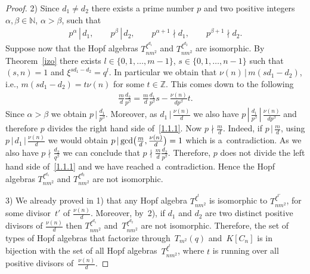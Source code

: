 \documentclass[10pt,a4paper]{amsart}
\numberwithin{equation}{section}
\begin{document}
\begin{proof}
2) Since $d_{1} \neq d_{2}$ there exists a prime number $p$ and two positive integers $\alpha, \beta \in \mathbb{N}$, $\alpha > \beta$, such that
\begin{gather*}
p^{\alpha} \,|\, d_{1}, \qquad p^{\beta} \,|\, d_{2}, \qquad p^{\alpha+1} \nmid d_{1}, \qquad p^{\beta+1} \nmid d_{2}.
\end{gather*}
Suppose now that the Hopf algebras $T_{nm^{2}}^ {\xi^{d_{1}}}$ and $T_{nm^{2}}^ {\xi^{d_{2}}}$ are isomorphic. By Theorem~\ref{izo} there
exists $l \in \{ 0, 1,\dots, m-1 \}$, $s \in \{ 0, 1, \dots, n-1 \}$ such that $(s, n) = 1$ and $\xi^{sd_{1} - d_{2}} = q^{l}$. In particular we obtain that $\nu(n) \,|\, m(sd_{1} - d_{2})$, i.e., $m(sd_{1} - d_{2}) = t \nu(n)$ for some $t \in \mathbb{Z}$. This comes down to the following
\begin{gather}\label{1.1.1}
 \frac{m}{d} \frac{d_{2}}{p^{\beta}} = \frac{m}{d} \frac{d_{1}}{p^{\beta}} s - \frac{\nu(n)}{dp^{\beta}} t.
\end{gather}
Since $\alpha > \beta$ we obtain $p \,|\, \frac{d_{1}}{p^{\beta}}$. Moreover, as $ d_{1} \,|\, \frac{\nu(n)}{d}$ we also have $p \,|\,\frac{d_{1}}{p^{\beta}} \,|\, \frac{\nu(n)}{dp^{\beta}}$ and therefore $p$ divides the right hand side of~\eqref{1.1.1}. Now $p \nmid
 \frac{m}{d}$. Indeed, if $p \,|\, \frac{m}{d}$, using $p \,|\, d_{1} \,|\, \frac{\nu(n)}{d}$ we would obtain $p \,|\, {\rm gcd}\big( \frac{m}{d}, \frac{\nu(n)}{d}\big) = 1$ which is a~contradiction. As we also have $p \nmid \frac{d_{2}}{q^{\beta}}$ we can conclude that $p
\nmid \frac{m}{d} \frac{d_{2}}{p^{\beta}}$. Therefore, $p$ does not divide the left hand side of~\eqref{1.1.1} and we have reached a~contradiction. Hence the Hopf algebras $T_{nm^{2}}^ {\xi^{d_{1}}}$ and $T_{nm^{2}}^ {\xi^{d_{2}}}$ are not isomorphic.

3) We already proved in 1) that any Hopf algebra $T_{nm^{2}}^{\xi^{t}}$ is isomorphic to $T_{nm^{2}}^ {\xi^{t'}}$, for some divisor~$t'$ of $ \frac{\nu(n)}{d}$. Moreover, by~2), if $d_1$ and $d_2$ are two distinct positive divisors of $ \frac{\nu(n)}{d}$ then $T_{nm^{2}}^ {\xi^{d_{1}}}$
and~$T_{nm^{2}}^ {\xi^{d_{2}}}$ are not isomorphic. Therefore, the set of types of Hopf algebras that factorize through~$T_{m^{2}}(q)$ and~$K[C_n]$ is in bijection with the set of all Hopf algebras~$T_{nm^{2}}^ {\xi^{t}}$, where $t$ is running over all positive divisors of~$ \frac{\nu(n)}{d}$.
\end{proof}
\end{document}
